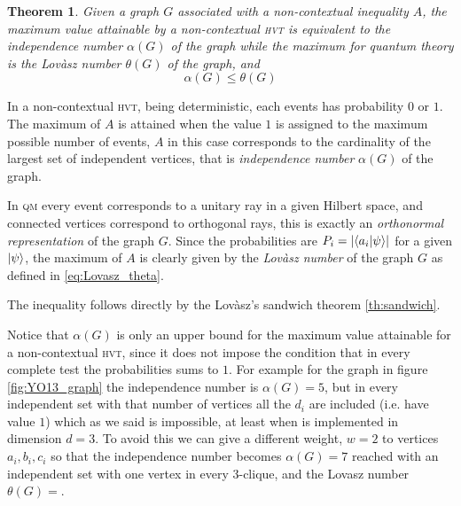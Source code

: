 \documentclass[a4paper]{article}
\newcommand{\abs}[1]{\lvert #1 \rvert}
\newcommand{\acron}[1]{\textsc{#1}}
\newcommand{\HVT}{\acron{hvt}}
\newcommand{\QM}{\acron{qm}}
\newtheorem{theorem}{Theorem}[section]
\theoremstyle{definition}
\let\oldproof\proof
\let\oldendproof\endproof
\renewenvironment{proof}
    {
        \begin{framed} 
        \oldproof
    }
    {
        \oldendproof 
        \end{framed}
    }
\begin{document}
\begin{theorem}
    Given a graph $G$ associated with a non-contextual inequality $A$, the maximum value
    attainable by a non-contextual \HVT{} is equivalent to the independence number
    $\alpha(G)$ of the graph while the maximum for quantum theory is the Lovàsz number
    $\theta(G)$ of the graph, and
    \begin{equation}
        \alpha(G) \le \theta(G)
    \end{equation}
    \label{th:nc_graph_indilov}
\end{theorem}
\begin{proof}
    In a non-contextual \HVT{}, being deterministic, each events has probability
    $0$ or $1$.
    The maximum of $A$ is attained when the value $1$ is assigned to the maximum
    possible number of events, $A$ in this case corresponds to the cardinality
    of the largest set of independent vertices, that is \emph{independence
    number} $\alpha(G)$ of the graph.

    In \QM{} every event corresponds to a unitary ray in a given Hilbert space,
    and connected vertices correspond to orthogonal rays, this is exactly an
    \emph{orthonormal representation} of the graph $G$.
    Since the probabilities are $P_i = \abs{\braket{a_i | \psi}}$ for a
    given $\Ket{\psi}$, the maximum of $A$ is clearly given by the
    \emph{Lovàsz number} of the graph $G$ as defined in
    \eqref{eq:Lovasz_theta}.

    The inequality follows directly by the Lovàsz's sandwich theorem
    \ref{th:sandwich}.
\end{proof}

Notice that $\alpha(G)$ is only an upper bound for the maximum value attainable
for a non-contextual \HVT{}, since it does not impose the condition that in every
complete test the probabilities sums to $1$.
For example for the graph in figure \ref{fig:YO13_graph} the independence number
is $\alpha(G) = 5$, but in every independent set with that number of vertices
all the $d_i$ are included (i.e. have value $1$) which as we
said is impossible, at least when is implemented in dimension $d=3$.
To avoid this we can give a different weight, $w=2$ to vertices $a_i,b_i, c_i$
so that the independence number becomes $\alpha(G) = 7$ reached with an 
independent set with one vertex in every 3-clique, and the Lovasz number
$\theta(G)= $.
\end{document}
